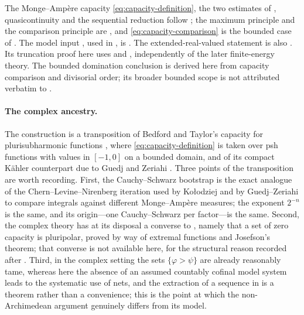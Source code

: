The Monge--Amp\`ere capacity \eqref{eq:capacity-definition}, the two
estimates of , quasicontinuity
 and the sequential reduction
 follow
\cite[\S4]{BFJ15}; the maximum principle
 and the comparison principle
 are
\cite[Theorem~5.1 and Corollaries~5.2--5.3]{BFJ15}, and
\eqref{eq:capacity-comparison} is the bounded case of
\cite[Lemma~8.3]{BFJ15}.  The model input
, used in
, is \cite[\S5]{BFJ16}.
The extended-real-valued statement
 is also
\cite[Proposition~4.6]{BFJ15}.  Its truncation proof here uses
 and
, independently of the later
finite-energy theory.  The bounded domination conclusion is derived here
from capacity comparison and divisorial order; its broader bounded scope
is not attributed verbatim to \cite[Lemma~8.4]{BFJ15}.

\paragraph{The complex ancestry.}  The construction is a transposition of
Bedford and Taylor's capacity for plurisubharmonic functions \cite{BT82},
where \eqref{eq:capacity-definition} is taken over psh functions with values
in $[-1,0]$ on a bounded domain, and of its compact K\"ahler counterpart
due to Guedj and Zeriahi \cite{GZ05}.  Three points of the transposition are
worth recording.  First, the Cauchy--Schwarz bootstrap
 is the exact analogue of the
Chern--Levine--Nirenberg iteration used by Ko\l odziej \cite{Kol98} and by
Guedj--Zeriahi \cite{GZ05,GZ07} to compare integrals against different
Monge--Amp\`ere measures; the exponent $2^{-n}$ is the same, and its
origin---one Cauchy--Schwarz per factor---is the same.  Second, the complex
theory has at its disposal a converse to
, namely that a set of zero capacity is
pluripolar, proved by way of extremal functions and Josefson's theorem; that
converse is not available here, for the structural reason recorded after
.  Third, in the complex setting the sets
$\{\varphi>\psi\}$ are already reasonably tame, whereas here the
absence of an assumed countably cofinal model system leads to the
systematic use of nets, and the
extraction of a sequence in
 is a theorem rather than a convenience;
this is the point at which the non-Archimedean argument genuinely differs
from its model.

